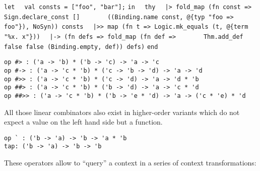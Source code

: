 \begin{isabellebody}
\begin{isamarkuptext}
  \smallskip\begin{mldecls}
\verb|let|\isasep\isanewline%
\verb|  val consts = ["foo", "bar"];|\isasep\isanewline%
\verb|in|\isasep\isanewline%
\verb|  thy|\isasep\isanewline%
\verb|  |\verb,|,\verb|> fold_map (fn const => Sign.declare_const []|\isasep\isanewline%
\verb|       ((Binding.name const, @{typ "foo => foo"}), NoSyn)) consts|\isasep\isanewline%
\verb|  |\verb,|,\verb|>> map (fn t => Logic.mk_equals (t, @{term "%x. x"}))|\isasep\isanewline%
\verb|  |\verb,|,\verb|-> (fn defs => fold_map (fn def =>|\isasep\isanewline%
\verb|       Thm.add_def false false (Binding.empty, def)) defs)|\isasep\isanewline%
\verb|end|
  \end{mldecls}%
\end{isamarkuptext}%
\isamarkuptrue%
%
\isadelimmlref
%
\endisadelimmlref
%
\isatagmlref
%
\begin{isamarkuptext}%
\begin{mldecls}
  \verb|op #> : ('a -> 'b) * ('b -> 'c) -> 'a -> 'c| \\
  \verb|op #-> : ('a -> 'c * 'b) * ('c -> 'b -> 'd) -> 'a -> 'd| \\
  \verb|op #>> : ('a -> 'c * 'b) * ('c -> 'd) -> 'a -> 'd * 'b| \\
  \verb|op ##> : ('a -> 'c * 'b) * ('b -> 'd) -> 'a -> 'c * 'd| \\
  \verb|op ##>> : ('a -> 'c * 'b) * ('b -> 'e * 'd) -> 'a -> ('c * 'e) * 'd| \\
  \end{mldecls}%
\end{isamarkuptext}%
\isamarkuptrue%
%
\endisatagmlref
{\isafoldmlref}%
%
\isadelimmlref
%
\endisadelimmlref
%
\begin{isamarkuptext}%
\noindent All those linear combinators also exist in higher-order
  variants which do not expect a value on the left hand side
  but a function.%
\end{isamarkuptext}%
\isamarkuptrue%
%
\isadelimmlref
%
\endisadelimmlref
%
\isatagmlref
%
\begin{isamarkuptext}%
\begin{mldecls}
  \verb|op ` : ('b -> 'a) -> 'b -> 'a * 'b| \\
  \verb|tap: ('b -> 'a) -> 'b -> 'b| \\
  \end{mldecls}%
\end{isamarkuptext}%
\isamarkuptrue%
%
\endisatagmlref
{\isafoldmlref}%
%
\isadelimmlref
%
\endisadelimmlref
%
\begin{isamarkuptext}%
\noindent These operators allow to ``query'' a context
  in a series of context transformations:


\end{isamarkuptext}
\end{isabellebody}
